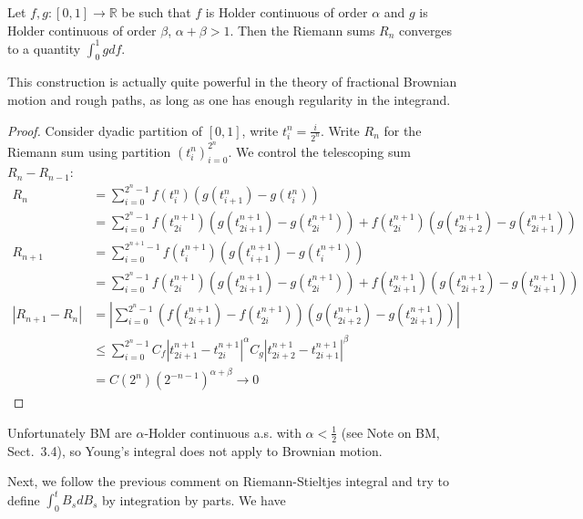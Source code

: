 \begin{definition}
	Let $f, g: [0,1] \to \mathbb{R}$ be such that $f$ is Holder continuous of order $\alpha$ and $g$ is Holder continuous of order $\beta$, $\alpha + \beta > 1$. Then the Riemann sums $R_n$ converges to a quantity $\int _0^1 g d f$.
\end{definition}
\begin{remark}
	This construction is actually quite powerful in the theory of fractional Brownian motion and rough paths, as long as one has enough regularity in the integrand.
\end{remark}
\begin{proof}
	Consider dyadic partition of $[0,1]$, write $t^n_i = \frac{i}{2^n}$. Write $R_n$ for the Riemann sum using partition $(t^n_i)_{i=0}^{2^n}$.
	We control the telescoping sum $R_n - R_{n-1}$:
	\begin{align*}
		R_n &= \sum_{i=0}^{2^n - 1} f(t^n_i) \left( g(t^n_{i+1}) - g(t^n_i) \right) \\
		&= \sum_{i=0}^{2^{n} - 1} f(t^{n+1}_{2i}) \left( g(t^{n+1}_{2i+1}) - g(t^{n+1}_{2i}) \right) + f(t^{n+1}_{2i}) \left( g(t^{n+1}_{2i+2}) - g(t^{n+1}_{2i+1}) \right) \\
		R_{n + 1} &= \sum_{i=0}^{2^{n+1} - 1} f(t^{n+1}_i) \left( g(t^{n+1}_{i+1}) - g(t^{n+1}_i) \right) \\
		&= \sum_{i=0}^{2^{n}- 1} f(t^{n+1}_{2i}) \left( g(t^{n+1}_{2i+1}) - g(t^{n+1}_{2i}) \right) + f(t^{n+1}_{2i + 1} ) \left( g(t^{n+1}_{2i+2}) - g(t^{n+1}_{2i+1}) \right) \\
		|R_{n+1} - R_n| &= \left| \sum_{i=0}^{2^n - 1} (f(t^{n+1}_{2i+ 1} ) - f(t^{n+1}_{2i})) \left( g(t^{n+1}_{2i+2}) - g(t^{n+1}_{2i+1}) \right) \right| \\
		&\leq \sum_{i=0}^{2^n - 1} C_f |t^{n+1}_{2i+1} - t^{n+1}_{2i}|^{\alpha} C_g |t^{n+1}_{2i+2} - t^{n+1}_{2i+1}|^{\beta} \\
		&= C (2^n) (2^{-n - 1})^{\alpha + \beta} \to 0
	\end{align*}
\end{proof}


Unfortunately BM are $\alpha$-Holder continuous a.s. with $\alpha < \frac{1}{2}$ (see Note on BM, Sect.~3.4), so Young's integral does not apply to Brownian motion.

Next, we follow the previous comment on Riemann-Stieltjes integral and try to define $\int _0^t B_s dB_s$ by integration by parts. We have


